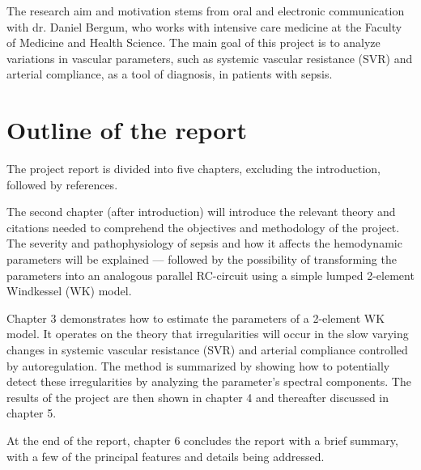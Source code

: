 The research aim and motivation stems from oral and electronic communication with dr. Daniel Bergum, who works with intensive care medicine at the Faculty of Medicine and Health Science. The main goal of this project is to analyze variations in vascular parameters, such as systemic vascular resistance (SVR) and arterial compliance, as a tool of diagnosis, in patients with sepsis.  


\section{Outline of the report}

The project report is divided into five chapters, excluding the introduction, followed by references. 

The second chapter (after introduction) will introduce the relevant theory and citations needed to comprehend the objectives and methodology of the project. The severity and pathophysiology of sepsis and how it affects the hemodynamic parameters will be explained — followed by the possibility of transforming the parameters into an analogous parallel RC-circuit using a simple lumped 2-element Windkessel (WK) model.

Chapter 3 demonstrates how to estimate the parameters of a 2-element WK model. It operates on the theory that irregularities will occur in the slow varying changes in systemic vascular resistance (SVR) and arterial compliance controlled by autoregulation. The method is summarized by showing how to potentially detect these irregularities by analyzing the parameter's spectral components. The results of the project are then shown in chapter 4 and thereafter discussed in chapter 5.

At the end of the report, chapter 6 concludes the report with a brief summary, with a few of the principal features and details being addressed.


\cleardoublepage
